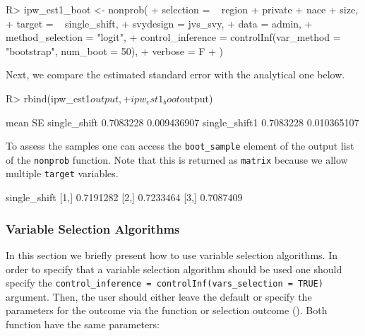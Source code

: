 \documentclass[
]{jss}
\begin{document}
\begin{CodeChunk}
\begin{CodeInput}
R> ipw_est1_boot <- nonprob(
+   selection = ~ region + private + nace + size,
+   target = ~ single_shift,
+   svydesign = jvs_svy,
+   data = admin,
+   method_selection = "logit",
+   control_inference = controlInf(var_method = "bootstrap", num_boot = 50),
+   verbose = F
+ )
\end{CodeInput}
\end{CodeChunk}

Next, we compare the estimated standard error with the analytical one
below.

\begin{CodeChunk}
\begin{CodeInput}
R> rbind(ipw_est1$output,
+       ipw_est1_boot$output)
\end{CodeInput}
\begin{CodeOutput}
                   mean          SE
single_shift  0.7083228 0.009436907
single_shift1 0.7083228 0.010365107
\end{CodeOutput}
\end{CodeChunk}

To assess the samples one can access the \texttt{boot\_sample} element
of the output list of the \texttt{nonprob} function. Note that this is
returned as \texttt{matrix} because we allow multiple \texttt{target}
variables.

\begin{CodeChunk}
\begin{CodeOutput}
     single_shift
[1,]    0.7191282
[2,]    0.7233464
[3,]    0.7087409
\end{CodeOutput}
\end{CodeChunk}

\subsubsection{Variable Selection
Algorithms}\label{variable-selection-algorithms}

In this section we briefly present how to use variable selection
algorithms. In order to specify that a variable selection algorithm
should be used one should specify the
\texttt{control\_inference\ =\ controlInf(vars\_selection\ =\ TRUE)}
argument. Then, the user should either leave the default or specify the
parameters for the outcome via the  function or
selection outcome (). Both function have the same
parameters:
\end{document}

